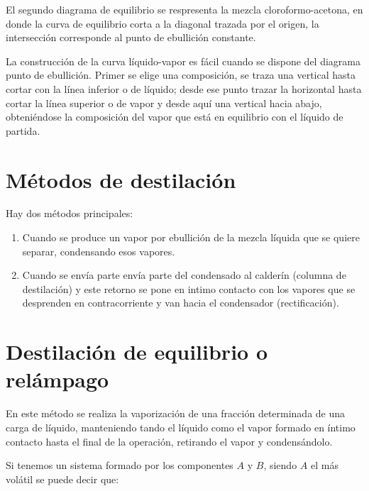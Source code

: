 \documentclass[11pt,openany]{book}
\begin{document}
El segundo diagrama de equilibrio se respresenta la mezcla cloroformo-acetona, en donde la curva de equilibrio corta a la 
diagonal trazada por el origen, la intersección corresponde al punto de ebullición constante.

La construcción de la curva líquido-vapor es fácil cuando se dispone del diagrama punto de
 ebullición. Primer se elige una composición, se traza una vertical hasta 
 cortar con la línea inferior o de líquido; desde ese punto trazar la horizontal hasta cortar la línea 
 superior o de vapor y desde aquí una vertical hacia abajo, obteniéndose la composición del vapor 
 que está en equilibrio con el líquido de partida.

 \section{Métodos de destilación}

 Hay dos métodos principales:
 \begin{enumerate}
 \item Cuando se produce un vapor por ebullición de la mezcla líquida que se quiere separar, condensando esos vapores.
 \item Cuando se envía parte envía parte del condensado al calderín (columna de destilación) y este retorno 
 se pone en intimo contacto con los vapores que se desprenden en contracorriente y van hacia el condensador (rectificación).
 \end{enumerate}



\section {Destilación de equilibrio o relámpago}

En este método se realiza la vaporización de una fracción determinada de una carga de líquido,
manteniendo tando el líquido como el vapor formado en íntimo contacto hasta el final de la 
operación, retirando el vapor y condensándolo.

Si tenemos un sistema formado por los componentes $A$ y $B$, siendo $A$ el más volátil se puede decir que:
\end{document}
